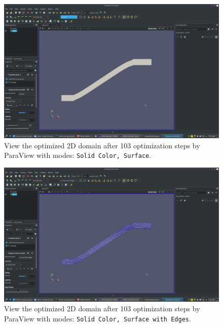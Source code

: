 \documentclass[onsided]{book}
\numberwithin{equation}{section}
\begin{document}
\begin{enumerate}
\begin{enumerate}
        \begin{figure}[H]
            \centering
            \includegraphics[height=0.44\textheight]{optimized_domain_2D_after_103_steps_Solid_Color_Surface}
            \caption{View the optimized 2D domain after 103 optimization steps by ParaView with modes: \texttt{Solid Color, Surface}.}
        \end{figure}
        
        \begin{figure}[H]
            \centering
            \includegraphics[height=0.44\textheight]{optimized_domain_2D_after_103_steps_Solid_Color_Surface_with_Edges}
            \caption{View the optimized 2D domain after 103 optimization steps by ParaView with modes: \texttt{Solid Color, Surface with Edges}.}
        \end{figure}
        

\end{enumerate}
\end{enumerate}
\end{document}
